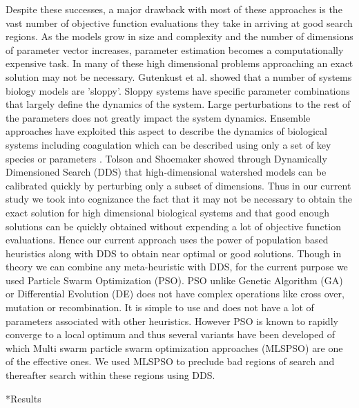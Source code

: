 \documentclass[12pt]{article}
\makeatletter
\renewcommand\section{\@startsection
	{subsection}{2}{0mm}
	{-0.2in}
	{0.05\baselineskip}
	{\normalfont\large\bfseries}}
\makeatother
\begin{document}
Despite these successes, a  major drawback with most of these approaches is the vast number of objective function evaluations they take in arriving at good search regions. As the models grow in size and complexity and the number of dimensions of parameter vector increases,  parameter estimation becomes a computationally expensive task. In many of these high dimensional problems approaching an exact solution may not be necessary. Gutenkust et al. \cite{gutenkunst2007universally} showed that a number of systems biology models are 'sloppy'. Sloppy systems have specific parameter combinations that largely define the dynamics of the system. Large perturbations to the rest of the parameters does not greatly impact the system dynamics. Ensemble approaches \cite{song2010ensembles,luan2010ensembles} have exploited this aspect to describe the dynamics of biological systems including coagulation which can be described using only a set of key species or parameters \cite{sagar2015dynamic}. Tolson and Shoemaker \cite{tolson2007dynamically} showed through Dynamically Dimensioned Search (DDS) that high-dimensional watershed models can be calibrated quickly by perturbing only a subset of dimensions. Thus in our current study we took into cognizance the fact that it may not be necessary to obtain the exact solution for high dimensional biological systems and that good enough solutions can be quickly obtained without expending a lot of objective function evaluations. Hence our current approach uses the power of population based heuristics along with DDS to obtain near optimal or good solutions. Though in theory we can combine any meta-heuristic with DDS, for the current purpose we used Particle Swarm Optimization (PSO). PSO unlike Genetic Algorithm (GA) or Differential Evolution (DE) does not have complex operations like cross over, mutation or recombination. It is simple to use and does not have a lot of parameters associated with other heuristics. However PSO is known to rapidly converge to a local optimum and thus several variants \cite{peer2003using,zhan2009adaptive,li2007fast} have been developed of which Multi swarm particle swarm optimization approaches (MLSPSO) \cite{zhao2008dynamic,liang2005dynamic} are one of the effective ones. We used MLSPSO to preclude bad regions of search and thereafter search within these regions using DDS.

\clearpage

\section*{Results}
\end{document}

